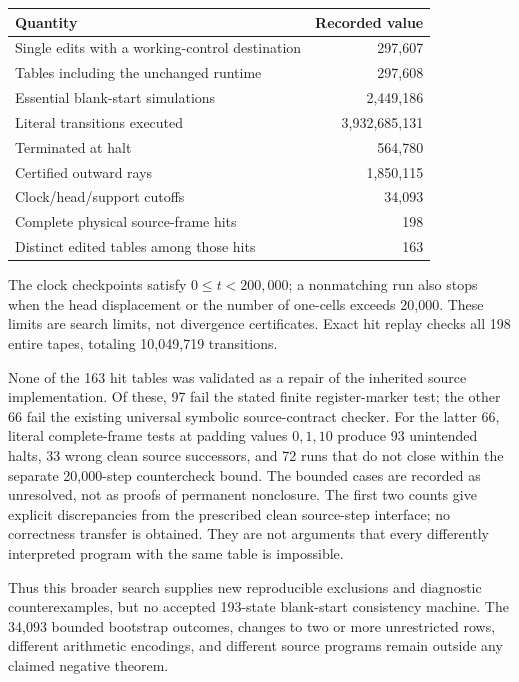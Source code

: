 \begin{center}
\begin{tabular}{lr}
\hline
Quantity & Recorded value\\\hline
Single edits with a working-control destination &297,607\\
Tables including the unchanged runtime &297,608\\
Essential blank-start simulations &2,449,186\\
Literal transitions executed &3,932,685,131\\
Terminated at halt &564,780\\
Certified outward rays &1,850,115\\
Clock/head/support cutoffs &34,093\\
Complete physical source-frame hits &198\\
Distinct edited tables among those hits &163\\\hline
\end{tabular}
\end{center}

The clock checkpoints satisfy $0\leq t<200{,}000$; a nonmatching run also
stops when the head displacement or the number of one-cells exceeds 20,000.
These limits are search limits, not divergence certificates.  Exact hit
replay checks all 198 entire tapes, totaling 10,049,719 transitions.

None of the 163 hit tables was validated as a repair of the inherited
source implementation.  Of these, 97 fail the stated finite register-marker
test; the other 66 fail the existing universal symbolic source-contract
checker.  For the latter 66, literal complete-frame tests at padding values
$0,1,10$ produce 93 unintended halts, 33 wrong clean source successors, and
72 runs that do not close within the separate 20,000-step countercheck
bound.  The bounded cases are recorded as unresolved, not as proofs of
permanent nonclosure.  The first two counts give explicit discrepancies from the prescribed
clean source-step interface; no correctness transfer is obtained.  They are
not arguments that
every differently interpreted program with the same table is impossible.

Thus this broader search supplies new reproducible exclusions and diagnostic
counterexamples, but no accepted 193-state blank-start consistency machine.
The 34,093 bounded bootstrap outcomes, changes to two or more unrestricted
rows, different arithmetic encodings, and different source programs remain
outside any claimed negative theorem.

